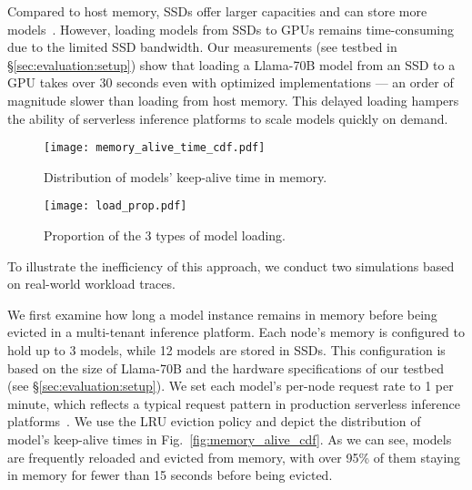 Compared to host memory, SSDs offer larger capacities and can store more models~\cite{fu_serverlessllm_2024}.
However, loading models from SSDs to GPUs remains time-consuming due to the limited SSD bandwidth. 
Our measurements (see testbed in \S\ref{sec:evaluation:setup}) show that loading a Llama-70B model from an SSD to a GPU takes over 30 seconds even with optimized implementations --- an order of magnitude slower than loading from host memory. 
This delayed loading hampers the ability of serverless inference platforms to scale models quickly on demand. 

\begin{figure}[t]
    \centering
    \begin{minipage}{0.225\textwidth}
        \centering
        \texttt{[image: memory\_alive\_time\_cdf.pdf]} 
        \vspace{-1em}
        \caption{Distribution of models' keep-alive time in memory.}  
        \label{fig:memory_alive_cdf}
    \end{minipage}\hfill
    \begin{minipage}{0.225\textwidth}
        \centering
        \texttt{[image: load\_prop.pdf]}
        \vspace{-1em}
        \caption{Proportion of the 3 types of model loading.}
        \label{fig:load_prop}
    \end{minipage}
    \vspace{-2em}
\end{figure}


To illustrate the inefficiency of this approach, we conduct two simulations based on real-world workload traces.

We first examine how long a model instance remains in memory before being evicted in a multi-tenant inference platform. 
Each node's memory is configured to hold up to 3 models, while 12 models are stored in SSDs. This configuration is based on the size of Llama-70B and the hardware specifications of our testbed (see \S\ref{sec:evaluation:setup}). 
We set each model's per-node request rate to 1 per minute, which reflects a typical request pattern in production serverless inference platforms~\cite{faaswap}. 
We use the LRU eviction policy and depict the distribution of model's keep-alive times in Fig.~\ref{fig:memory_alive_cdf}.
As we can see, models are frequently reloaded and evicted from memory, with over 95\% of them staying in memory for fewer than 15 seconds before being evicted. 

